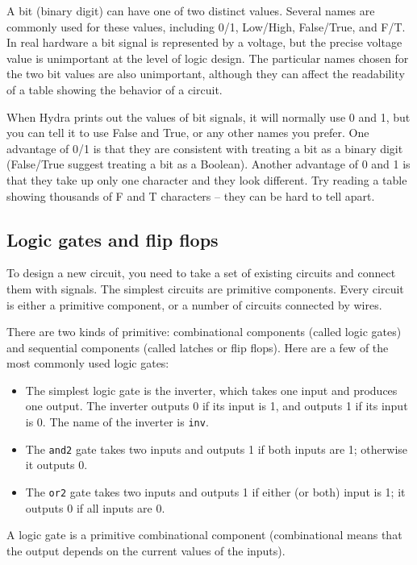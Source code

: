 \documentclass[]{svmono}
\begin{document}
A bit (binary digit) can have one of two distinct values.  Several
names are commonly used for these values, including 0/1, Low/High,
False/True, and F/T.  In real hardware a bit signal is represented
by a voltage, but the precise voltage value is unimportant at the
level of logic design.  The particular names chosen for the two
bit values are also unimportant, although they can affect the
readability of a table showing the behavior of a circuit.

When Hydra prints out the values of bit signals, it will normally
use 0 and 1, but you can tell it to use False and True, or any
other names you prefer.  One advantage of 0/1 is that they are
consistent with treating a bit as a binary digit (False/True
suggest treating a bit as a Boolean).  Another advantage of 0 and
1 is that they take up only one character and they look different.
Try reading a table showing thousands of F and T characters --
they can be hard to tell apart.
\subsection*{Logic gates and flip flops}
\label{sec:orgadc5511}

To design a new circuit, you need to take a set of existing
circuits and connect them with signals.  The simplest circuits are
primitive components.  Every circuit is either a primitive
component, or a number of circuits connected by wires.

There are two kinds of primitive: combinational components (called
logic gates) and sequential components (called latches or flip flops).
Here are a few of the most commonly used logic gates:

\begin{itemize}
\item The simplest logic gate is the inverter, which takes one input and
produces one output.  The inverter outputs 0 if its input is 1, and
outputs 1 if its input is 0.  The name of the inverter is \texttt{inv}.
\item The \texttt{and2} gate takes two inputs and outputs 1 if both inputs are 1;
otherwise it outputs 0.
\item The \texttt{or2} gate takes two inputs and outputs 1 if either (or both)
input is 1; it outputs 0 if all inputs are 0.
\end{itemize}

A logic gate is a primitive combinational component (combinational
means that the output depends on the current values of the inputs).
\end{document}
